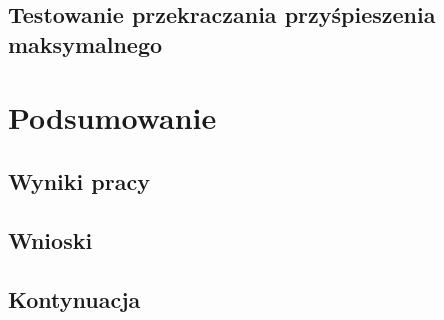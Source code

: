 \documentclass[11pt, a4paper, openright]{report}
\begin{document}
	\section{Testowanie przekraczania przyśpieszenia maksymalnego}
	\label{s:testowanie_przekraczania_przyśpieszenia_maksymalnego}
	
\chapter{Podsumowanie}
\label{ch:podsumowanie}
	\section{Wyniki pracy}
	\label{s:wyniki_pracy}
	\section{Wnioski}
	\label{s:wnioski}
	\section{Kontynuacja}
	\label{s:kontynuacja}
\end{document}
